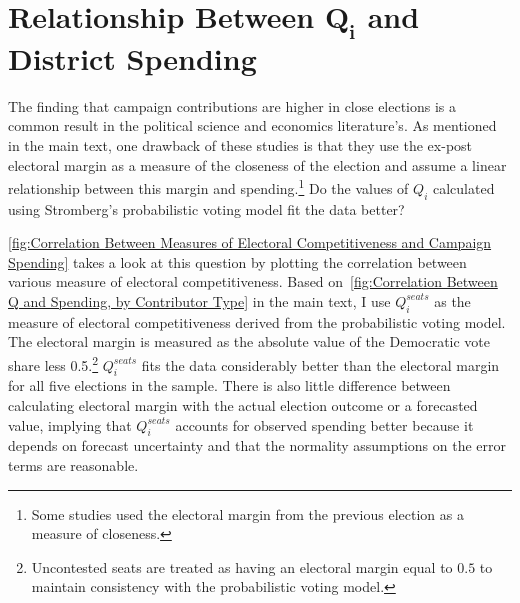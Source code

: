 \documentclass[12pt,final,fleqn]{article}
\theoremstyle{plain}
\begin{document}
\section{Relationship Between $\mathbf{Q_i}$ and District Spending}\label{sec:qi_spending}
The finding that campaign contributions are higher in close elections is a common result in the political science and economics literature's. As mentioned in the main text, one drawback of these studies is that they use the ex-post electoral margin as a measure of the closeness of the election and assume a linear relationship between this margin and spending.\footnote{Some studies used the electoral margin from the previous election as a measure of closeness.} Do the values of $Q_i$ calculated using Stromberg's probabilistic voting model fit the data better?

\autoref{fig:Correlation Between Measures of Electoral Competitiveness and Campaign Spending} takes a look at this question by plotting the correlation between various measure of electoral competitiveness. Based on~\autoref*{fig:Correlation Between Q and Spending, by Contributor Type} in the main text, I use $Q_i^{seats}$ as the measure of electoral competitiveness derived from the probabilistic voting model. The electoral margin is measured as the absolute value of the Democratic vote share less 0.5.\footnote{Uncontested seats are treated as having an electoral margin equal to $0.5$ to maintain consistency with the probabilistic voting model.} $Q_i^{seats}$ fits the data considerably better than the electoral margin for all five elections in the sample. There is also little difference between calculating electoral margin with the actual election outcome or a forecasted value, implying that $Q_i^{seats}$ accounts for observed spending better because it depends on forecast uncertainty and that the normality assumptions on the error terms are reasonable. 
\end{document}
